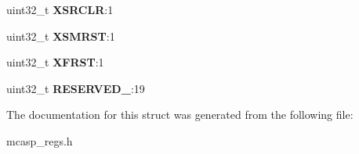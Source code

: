 \begin{DoxyCompactItemize}
\item 
\hypertarget{structMCASP__GBLCTL_a55e486cc16b9df155dd5da3fb156b726}{uint32\-\_\-t {\bfseries X\-S\-R\-C\-L\-R}\-:1}\label{structMCASP__GBLCTL_a55e486cc16b9df155dd5da3fb156b726}

\item 
\hypertarget{structMCASP__GBLCTL_a8c1ec641c192cc6fe7716adc6b5a60e2}{uint32\-\_\-t {\bfseries X\-S\-M\-R\-S\-T}\-:1}\label{structMCASP__GBLCTL_a8c1ec641c192cc6fe7716adc6b5a60e2}

\item 
\hypertarget{structMCASP__GBLCTL_a9fae6425385bd6205e7cb1970908b7f5}{uint32\-\_\-t {\bfseries X\-F\-R\-S\-T}\-:1}\label{structMCASP__GBLCTL_a9fae6425385bd6205e7cb1970908b7f5}

\item 
\hypertarget{structMCASP__GBLCTL_a7bb7f118a45480e17dbf5d8a7757e512}{uint32\-\_\-t {\bfseries R\-E\-S\-E\-R\-V\-E\-D\-\_}\-:19}\label{structMCASP__GBLCTL_a7bb7f118a45480e17dbf5d8a7757e512}

\end{DoxyCompactItemize}


The documentation for this struct was generated from the following file\-:\begin{DoxyCompactItemize}
\item 
mcasp\-\_\-regs.\-h\end{DoxyCompactItemize}
